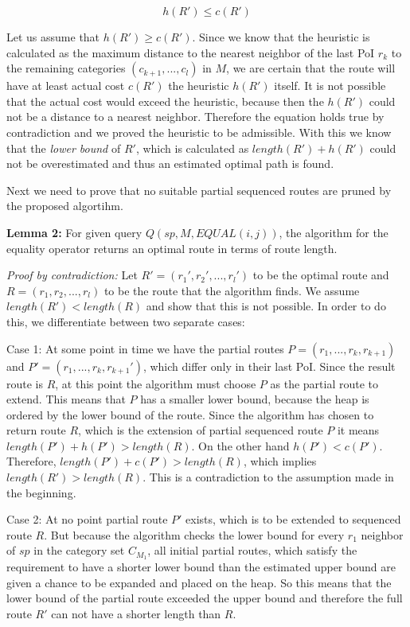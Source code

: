 \begin{equation}
h(R') \leq c(R')
\end{equation} 

Let us assume that $h(R') \geq c(R')$. Since we know that the heuristic is calculated as the maximum distance to the nearest neighbor of the last PoI $r_k$ to the remaining categories $(c_{k+1}, ..., c_l)$ in $M$, we are certain that the route will have at least actual cost $c(R')$ the heuristic $h(R')$ itself. It is not possible that the actual cost would exceed the heuristic, because then the $h(R')$ could not be a distance to a nearest neighbor. Therefore the equation holds true by contradiction and we proved the heuristic to be admissible. With this we know that the \textit{lower bound} of $R'$, which is calculated as $length(R') + h(R')$ could not be overestimated and thus an estimated optimal path is found.

Next we need to prove that no suitable partial sequenced routes are pruned by the proposed algortihm.

\textbf{Lemma 2:} For given query $Q(sp, M, EQUAL(i, j))$, the algorithm for the equality operator returns an optimal route in terms of route length.

\textit{Proof by contradiction:} Let $R' = (r_1', r_2', ..., r_l')$ to be the optimal route and $R = (r_1, r_2, ..., r_l)$ to be the route that the algorithm finds. We assume $length(R') < length(R)$ and show that this is not possible. In order to do this, we differentiate between two separate cases: 

Case 1: At some point in time we have the partial routes $P = (r_1, ..., r_k, r_{k+1})$ and $P' = (r_1, ..., r_k, r_{k+1}')$, which differ only in their last PoI. Since the result route is $R$, at this point the algorithm must choose $P$ as the partial route to extend. This means that $P$ has a smaller lower bound, because the heap is ordered by the lower bound of the route. Since the algorithm has chosen to return route $R$, which is the extension of partial sequenced route $P$ it means $length(P')+ h(P') > length(R)$. On the other hand $h(P') < c(P')$. Therefore, $length (P')+ c(P') > length(R)$, which implies $length(R') > length(R)$. This is a contradiction to the assumption made in the beginning.

Case 2: At no point partial route $P'$ exists, which is to be extended to sequenced route $R$. But because the algorithm checks the lower bound for every $r_1$ neighbor of $sp$ in the category set $C_{M_1}$, all initial partial routes, which satisfy the requirement to have a shorter lower bound than the estimated upper bound are given a chance to be expanded and placed on the heap. So this means that the lower bound of the partial route exceeded the upper bound and therefore the full route $R'$ can not have a shorter length than $R$.

